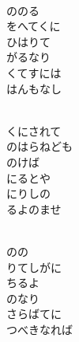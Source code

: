 \documentclass[10pt,b5j]{tarticle} %
\begin{document}
\begin{enumerate}
\begin{minipage}[c]{\blocksize}
    \end{minipage}
    \begin{minipage}[c]{\blocksize}
        
        \vspace{\linespace}
        \item~\\
        ののる\\
        をへてくに\\
        ひはりて\\
        がるなり\\
        くてすには\\
        はんもなし
        
    \end{minipage}
    \begin{minipage}[c]{\blocksize}
        
        \vspace{\linespace}
        \item~\\
        くにされて\\
        のはらねども\\
        のけば\\
        にるとや\\
        にりしの\\
        るよのませ
        
    \end{minipage}
    \begin{minipage}[c]{\blocksize}
        
        \vspace{\linespace}
        \item~\\
        のの\\
        りてしがに\\
        ちるよ\\
        のなり\\
        さらばてに\\
        つべきなれば
    
    \end{minipage}
\end{enumerate} %
\end{document}
